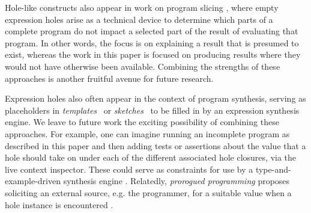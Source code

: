 
Hole-like constructs also appear in work on program slicing
\cite{DBLP:conf/icfp/PereraACL12,DBLP:journals/pacmpl/RicciottiSPC17}, where empty expression holes arise as a technical device to determine which parts of a complete program do not impact a selected part of the result of evaluating that program. In other words, the focus is on explaining a result that is presumed to exist, whereas the work in this paper is focused on producing results where they would not have otherwise been available. Combining the strengths of these approaches is another fruitful avenue for future research.


Expression holes also often appear in the context of program synthesis, serving as
placeholders in \emph{templates}~\cite{srivastava2013template} or
\emph{sketches}~\cite{solar2009sketching} to be filled in by an expression
synthesis engine. We leave to future work the exciting possibility of combining these approaches. For example, one can imagine running an incomplete program as described in this paper and then adding tests or assertions about the value that a hole should take on under each of the different associated hole closures, via the live context inspector. These could serve as  constraints for use by a type-and-example-driven synthesis engine \cite{DBLP:conf/popl/FrankleOWZ16}. Relatedly, \emph{prorogued programming} proposes soliciting an external source, e.g. the programmer, for a suitable value when a hole instance is encountered \cite{DBLP:conf/oopsla/AfshariBS12}.


